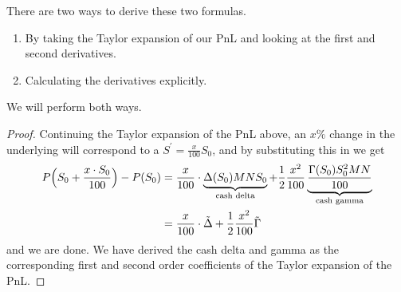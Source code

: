 \documentclass{article}
\begin{document}
    There are two ways to derive these two formulas. 
    \begin{enumerate}
      \item By taking the Taylor expansion of our PnL and looking at the first and second derivatives. 
      \item Calculating the derivatives explicitly. 
    \end{enumerate}
    We will perform both ways. 

    \begin{proof}
      Continuing the Taylor expansion of the PnL above, an $x\%$ change in the underlying will correspond to a $S^\prime = \frac{x}{100} S_0$, and by substituting this in we get 
      \begin{align} 
        P\Big(S_0 + \frac{x \cdot S_0}{100} \Big) - P (S_0) & = \frac{x}{100} \cdot \underbrace{\Delta (S_0) M N S_0}_{\text{cash delta}} + \frac{1}{2} \frac{x^2}{100} \underbrace{\frac{\Gamma (S_0) S_0^2 M N}{100}}_{\text{cash gamma}}  \\
        & = \frac{x}{100} \cdot \Tilde{\Delta} + \frac{1}{2} \frac{x^2}{100} \Tilde{\Gamma}
      \end{align}
      and we are done. We have derived the cash delta and gamma as the corresponding first and second order coefficients of the Taylor expansion of the PnL. 
    \end{proof}
\end{document}
